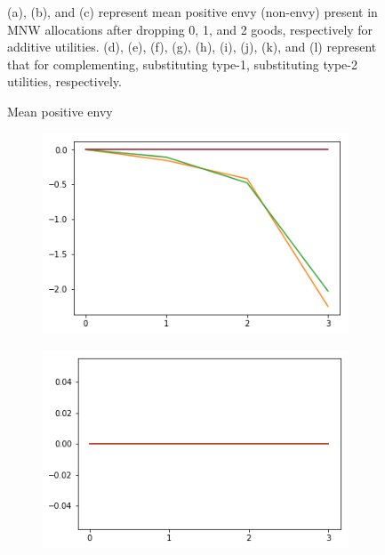 \begin{figure}[h!]
\begin{subfigure}[b]{0.3\linewidth}
    \caption{}
  \end{subfigure}
  \caption{Mean positive envy}
  \label{fig_efk_meanp}
  \small
    (a), (b), and (c) represent mean positive envy (non-envy) present in MNW allocations after dropping 0, 1, and 2 goods, respectively for additive utilities. (d), (e), (f), (g), (h), (i), (j), (k), and (l) represent that for complementing, substituting type-1, substituting type-2 utilities, respectively.
\end{figure}

\begin{figure}[h!]
  \centering
  \begin{subfigure}[b]{0.3\linewidth}
    \includegraphics[width=\linewidth]{images/add/ef0_means_neg.png}
    \caption{}
  \end{subfigure}
  \begin{subfigure}[b]{0.3\linewidth}
    \includegraphics[width=\linewidth]{images/add/ef1_means_neg.png}

\end{subfigure}
\end{figure}
